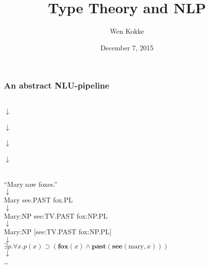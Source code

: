 \documentclass[11pt,t]{beamer}
\author{Wen Kokke}
\title{Type Theory and NLP}
\date{December 7, 2015}
\begin{document}
\maketitle

\begin{frame}
  \frametitle{An abstract NLU-pipeline}
  \vfill
  \begin{center}
    \begin{minipage}{0.3\linewidth}%
      \centering
      \\
      $\downarrow$\\
      \\
      $\downarrow$\\
      \\
      $\downarrow$\\
      \\
      $\downarrow$\\
      \\
    \end{minipage}%
    \begin{minipage}{0.7\linewidth}%
      \centering
      ``Mary saw foxes.''\\
      $\downarrow$\\
      Mary see.PAST fox.PL\\
      $\downarrow$\\
      Mary:NP see:TV.PAST fox:NP.PL\\
      $\downarrow$\\
      Mary:NP [see:TV.PAST fox:NP.PL]\\
      $\downarrow$\\
      $\exists p.\forall x.p(x)\supset(\mathbf{fox}(x)\land\mathbf{past}(\mathbf{see}(\text{mary},x)))$\\
      $\downarrow$\\
      \ldots\\
    \end{minipage}
  \end{center}
  \vfill
\end{frame}
\end{document}
